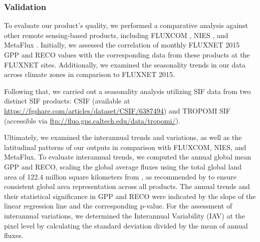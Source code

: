 \subsubsection{Validation}
To evaluate our product's quality, we performed a comparative analysis against other remote sensing-based products, including FLUXCOM \citep{jung2019fluxcom}, NIES \citep{zeng2020global}, and MetaFlux \citep{nathaniel2023metaflux}. Initially, we assessed the correlation of monthly FLUXNET 2015 GPP and RECO values with the corresponding data from these products at the FLUXNET sites. Additionally, we examined the seasonality trends in our data across climate zones in comparison to FLUXNET 2015. \par

Following that, we carried out a seasonality analysis utilizing SIF data from two distinct SIF products: CSIF \citep{zhang2018global} (available at \url{https://fgshare.com/articles/dataset/CSIF/6387494}) and TROPOMI SIF \citep{kohler2018global} (accessible via \url{ftp://fluo.gps.caltech.edu/data/tropomi/}).\par

Ultimately, we examined the interannual trends and variations, as well as the latitudinal patterns of our outputs in comparison with FLUXCOM, NIES, and MetaFlux. To evaluate interannual trends, we computed the annual global mean GPP and RECO, scaling the global average fluxes using the total global land area of 122.4 million square kilometers from \citep{friedl2010modis}, as recommended by \citep{jung2020scaling} to ensure consistent global area representation across all products. The annual trends and their statistical significance in GPP and RECO were indicated by the slope of the linear regression line and the corresponding p-value. For the assessment of interannual variations, we determined the Interannual Variability (IAV) at the pixel level by calculating the standard deviation divided by the mean of annual fluxes.\par

